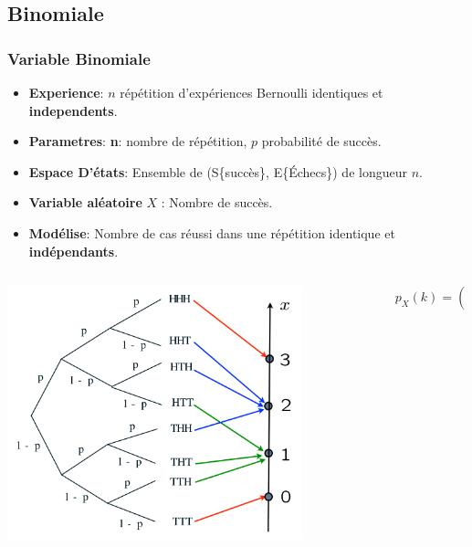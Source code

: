 \documentclass{beamer}
\begin{document}
\subsection{Binomiale}
\begin{frame}[t]
  \frametitle{Variable Binomiale}
  \textbf{}  
  \begin{itemize}
    \scriptsize
    \item \textbf{Experience}: $n$ répétition d'expériences Bernoulli identiques  et
      \alert{\textbf{independents}}.\\[8pt]
    \item \textbf{Parametres}: \alert{\textbf{n}}: nombre de répétition, $p$
      probabilité de succès.\\[8pt]
    \item \textbf{Espace D'états}: Ensemble de (S\{succès\}, E\{Échecs\}) de
      longueur $n$. \\[8pt]
    \item \textbf{Variable aléatoire} $X$ : Nombre de succès.\\[8pt]
    \item \textbf{Modélise}: Nombre de cas \alert{réussi} dans une répétition
      identique et \alert{\textbf{indépendants}}.\\[8pt]
  \end{itemize}
  \vspace*{0.2cm}
  \begin{columns}
    \begin{column}{0.5\textwidth}
      
        \centering
        \includegraphics[width=0.8\textwidth]{./binomial.png}
    \end{column}
    \begin{column}{0.5\textwidth}
      \pause
       \small
     \begin{equation*}
       p_X(k) = \binom{n}{k}p^k(1-p)^{n-k}
     \end{equation*} 
    \end{column}
  \end{columns}
\end{frame}
\end{document}
